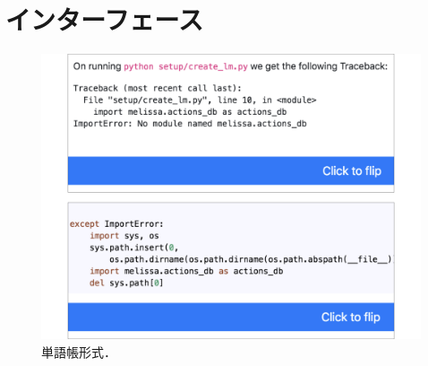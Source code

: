 \def\vector#1{\mbox{\boldmath $#1$}}

\chapter[インターフェース]{インターフェース}
\graphicspath{{Chapter4/Figs/}}


\begin{figure}[t]
	\centering
  \includegraphics[width=1.0\columnwidth]{flash-card.png}
  \caption{単語帳形式．}
  \label{fig:flash}
\end{figure}

